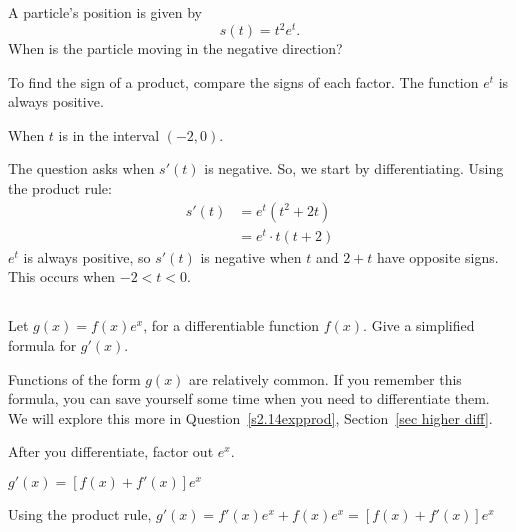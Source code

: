 \begin{Mquestion}
A particle's position  is given by
\[s(t)=t^2e^t.\]
 When is the particle moving in the negative direction?
\end{Mquestion}
\begin{hint}
To find the sign of a product, compare the signs of each factor. The function $e^t$ is always positive.
\end{hint}
\begin{answer}
When $t$ is in the interval $(-2,0)$.
\end{answer}
\begin{solution}
The question asks when $s'(t)$ is negative. So, we start by differentiating. Using the product rule:
\begin{align*}
s'(t)&=e^t(t^2+2t)\\
&=e^t \cdot t(t+2)
\end{align*}
$e^t$ is always positive, so $s'(t)$ is negative when $t$ and $2+t$ have opposite signs. This occurs when $-2<t<0$.
\end{solution}


\subsection*{\Application}

\begin{Mquestion}\label{s2.7expprod}
Let  $g(x)=f(x)e^x$, for a differentiable function $f(x)$. Give a simplified formula for $g'(x)$.


Functions of the form $g(x)$ are relatively common. If you remember this formula, you can save yourself some time when you need to differentiate them. We will explore this more in Question~\ref{s2.14expprod}, Section~\ref*{sec higher diff}.%
\end{Mquestion}
\begin{hint}
After you differentiate, factor out $e^x$.
\end{hint}
\begin{answer}
$g'(x)=[f(x)+f'(x)]e^x$
\end{answer}
\begin{solution}
Using the product rule,
$g'(x)=f'(x)e^x+f(x)e^x=[f(x)+f'(x)]e^x$
\end{solution}


